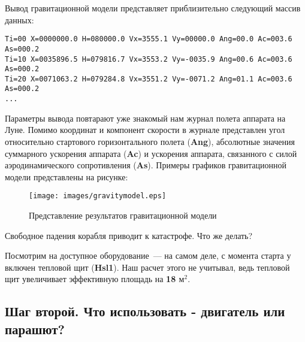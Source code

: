 \documentclass[12pt,a4paper]{article}
\begin{document}
\hfill

\noindent{}

\hfill

Вывод гравитационной модели представляет приблизительно следующий массив данных:

\begin{verbatim}
Ti=00 X=0000000.0 H=080000.0 Vx=3555.1 Vy=00000.0 Ang=00.0 Ac=003.6 As=000.2
Ti=10 X=0035896.5 H=079816.7 Vx=3553.2 Vy=-0035.9 Ang=00.6 Ac=003.6 As=000.2
Ti=20 X=0071063.2 H=079284.8 Vx=3551.2 Vy=-0071.2 Ang=01.1 Ac=003.6 As=000.2
...
\end{verbatim}

Параметры вывода повтарают уже знакомый нам журнал полета аппарата на Луне. Помимо
координат и компонент скорости в журнале представлен угол относительно стартового
горизонтального полета (\textbf{Ang}), абсолютные значения суммарного ускорения аппарата
(\textbf{Ac}) и ускорения аппарата, связанного с силой аэродинамического сопротивления
(\textbf{As}). Примеры графиков гравитационной модели представлены на рисунке:

\begin{figure}[tbh]
  \begin{center}
    \texttt{[image: images/gravitymodel.eps]}
    \caption{Представление результатов гравитационной модели}
    \label{Pic:gravitymodel}
  \end{center}
\end{figure}

Свободное падения корабля приводит к катастрофе. Что же делать?

Посмотрим на доступное оборудование~--- на самом деле, с момента старта у включен тепловой
щит (\textbf{Hsl1}). Наш расчет этого не учитывал, ведь тепловой щит увеличивает эффективную
площадь на \textbf{18 $\text{м}^2$}.

\hfill

\noindent{}

\subsection{Шаг второй. Что использовать - двигатель или парашют?}
\end{document}
